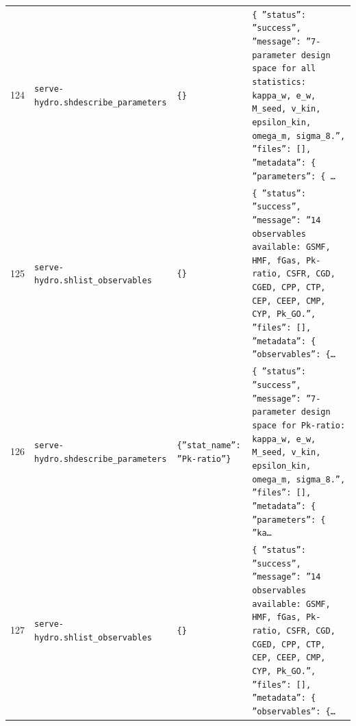 \documentclass[11pt,a4paper]{article}
\begin{document}
\begin{longtable}{@{}p{}p{}p{}p{}@{}}
124 & \texttt{serve-hydro.sh}\newline\texttt{describe\_\allowbreak{}parameters} & \texttt{\{\}\allowbreak{}} & \texttt{\{   ''status'':\allowbreak{} ''success'',\allowbreak{}   ''message'':\allowbreak{} ''7-parameter design space for all statistics:\allowbreak{} kappa\_\allowbreak{}w,\allowbreak{} e\_\allowbreak{}w,\allowbreak{} M\_\allowbreak{}seed,\allowbreak{} v\_\allowbreak{}kin,\allowbreak{} epsilon\_\allowbreak{}kin,\allowbreak{} omega\_\allowbreak{}m,\allowbreak{} sigma\_\allowbreak{}8.'',\allowbreak{}   ''files'':\allowbreak{} []\allowbreak{},\allowbreak{}   ''metadata'':\allowbreak{} \{     ''parameters'':\allowbreak{} \{    \ldots{}\allowbreak{}} \\
125 & \texttt{serve-hydro.sh}\newline\texttt{list\_\allowbreak{}observables} & \texttt{\{\}\allowbreak{}} & \texttt{\{   ''status'':\allowbreak{} ''success'',\allowbreak{}   ''message'':\allowbreak{} ''14 observables available:\allowbreak{} GSMF,\allowbreak{} HMF,\allowbreak{} fGas,\allowbreak{} Pk-ratio,\allowbreak{} CSFR,\allowbreak{} CGD,\allowbreak{} CGED,\allowbreak{} CPP,\allowbreak{} CTP,\allowbreak{} CEP,\allowbreak{} CEEP,\allowbreak{} CMP,\allowbreak{} CYP,\allowbreak{} Pk\_\allowbreak{}GO.'',\allowbreak{}   ''files'':\allowbreak{} []\allowbreak{},\allowbreak{}   ''metadata'':\allowbreak{} \{     ''observables'':\allowbreak{} \{\ldots{}\allowbreak{}} \\
126 & \texttt{serve-hydro.sh}\newline\texttt{describe\_\allowbreak{}parameters} & \texttt{\{''stat\_\allowbreak{}name'':\allowbreak{} ''Pk-ratio''\}\allowbreak{}} & \texttt{\{   ''status'':\allowbreak{} ''success'',\allowbreak{}   ''message'':\allowbreak{} ''7-parameter design space for Pk-ratio:\allowbreak{} kappa\_\allowbreak{}w,\allowbreak{} e\_\allowbreak{}w,\allowbreak{} M\_\allowbreak{}seed,\allowbreak{} v\_\allowbreak{}kin,\allowbreak{} epsilon\_\allowbreak{}kin,\allowbreak{} omega\_\allowbreak{}m,\allowbreak{} sigma\_\allowbreak{}8.'',\allowbreak{}   ''files'':\allowbreak{} []\allowbreak{},\allowbreak{}   ''metadata'':\allowbreak{} \{     ''parameters'':\allowbreak{} \{       ''ka\ldots{}\allowbreak{}} \\
127 & \texttt{serve-hydro.sh}\newline\texttt{list\_\allowbreak{}observables} & \texttt{\{\}\allowbreak{}} & \texttt{\{   ''status'':\allowbreak{} ''success'',\allowbreak{}   ''message'':\allowbreak{} ''14 observables available:\allowbreak{} GSMF,\allowbreak{} HMF,\allowbreak{} fGas,\allowbreak{} Pk-ratio,\allowbreak{} CSFR,\allowbreak{} CGD,\allowbreak{} CGED,\allowbreak{} CPP,\allowbreak{} CTP,\allowbreak{} CEP,\allowbreak{} CEEP,\allowbreak{} CMP,\allowbreak{} CYP,\allowbreak{} Pk\_\allowbreak{}GO.'',\allowbreak{}   ''files'':\allowbreak{} []\allowbreak{},\allowbreak{}   ''metadata'':\allowbreak{} \{     ''observables'':\allowbreak{} \{\ldots{}\allowbreak{}} \\

\end{longtable}
\end{document}
